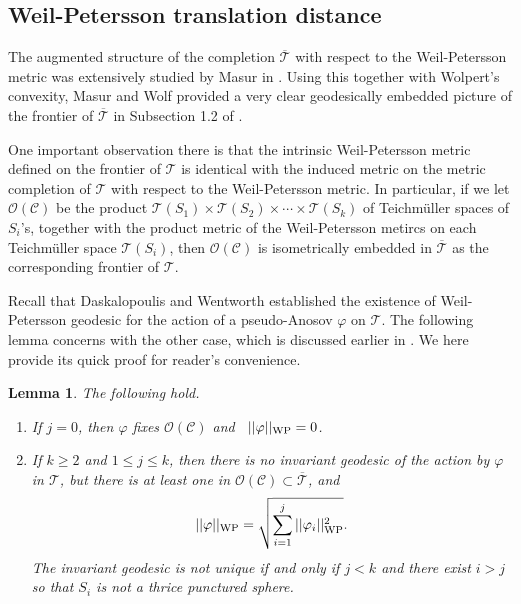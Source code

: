 \documentclass[11pt,reqno]{amsart}
\newtheorem{lemma}[theorem]{{\bf Lemma}}
\numberwithin{equation}{section}
\begin{document}
\subsection{Weil-Petersson translation distance}  

The augmented structure of the completion  $\overline{\mathcal{T}}$   
with respect to the Weil-Petersson metric 
was extensively studied by Masur in  \cite{Masur}.  
Using this together with Wolpert's convexity, 
Masur and Wolf provided a very clear geodesically embedded picture  
of the frontier of  $\overline{\mathcal{T}}$   in Subsection 1.2 of \cite{MW}.    

One important observation there is that 
the intrinsic Weil-Petersson metric defined on the frontier of  $\mathcal{T}$  is 
identical with the induced metric on the metric completion of  $\mathcal{T}$  
with respect to the Weil-Petersson metric.  
In particular, 
if we let  $\mathcal{O}(\mathcal{C})$  be 
the product $\mathcal{T}(S_1) \times \mathcal{T}(S_2) \times \cdots \times \mathcal{T}(S_k)$   
of Teichm\"uller spaces of  $S_i$'s, 
together with the product metric of 
the Weil-Petersson metircs on each Teichm\"uller space  $\mathcal{T}(S_i)$,  
then  $\mathcal{O}(\mathcal{C})$  is isometrically embedded in  $\overline{\mathcal{T}}$  
as the corresponding frontier of  $\mathcal{T}$. 

Recall that Daskalopoulis and Wentworth \cite{DW} 
established the existence of Weil-Petersson geodesic 
for the action of a pseudo-Anosov  $\varphi$   on  $\mathcal{T}$. 
The following lemma concerns with the other case, 
which is discussed earlier in \cite{Wolpert3}.  
We here provide its quick proof for reader's convenience.   

\begin{lemma} 
The following hold.   
\begin{enumerate}
\item 
	If  $j = 0$,  
	then  $\varphi$  fixes  $\mathcal{O}(\mathcal{C})$  and \,  $|| \varphi ||_{{\rm WP}} = 0$.  
\item 
	If  $k \geq 2$  and  $1 \leq j \leq k$, 
	then 
	there is no invariant geodesic of the action by  $\varphi$  in  $\mathcal{T}$, 
	but there is at least one in  $\mathcal{O}(\mathcal{C}) \subset \overline{\mathcal{T}}$, 
	and  
	\begin{equation}\label{Eq:WPnorm}
		|| \varphi ||_{{\rm WP}} = \sqrt{\sum_{i=1}^j || \varphi_i ||_{{\rm WP}}^2}.  
	\end{equation} 
	The invariant geodesic is not unique if and only if 
	$j < k$  and there exist  $i > j$  so that 
	$S_i$  is not a thrice punctured sphere.  
\end{enumerate}
\end{lemma}
\end{document}
